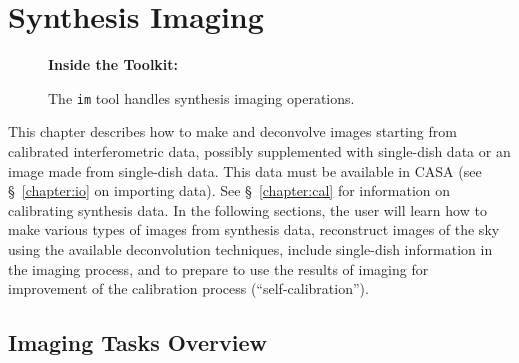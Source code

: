 

\chapter{Synthesis Imaging}
\label{chapter:im}

\begin{wrapfigure}{r}{2.5in}
  \begin{boxedminipage}{2.5in}
     \centerline{\bf Inside the Toolkit:}
     The {\tt im} tool handles synthesis imaging operations.
  \end{boxedminipage}
\end{wrapfigure}

This chapter describes how to make and deconvolve images starting from
calibrated interferometric data, possibly supplemented with
single-dish data or an image made from single-dish data.  This data
must be available in CASA (see \S~\ref{chapter:io} on importing data).
See \S~\ref{chapter:cal} for information on calibrating synthesis 
data.  In the following sections, the user will learn how to 
make various types of images from synthesis data, reconstruct images
of the sky using the available deconvolution techniques, include
single-dish information in the imaging process, and to prepare
to use the results of imaging for improvement of the calibration 
process (``self-calibration'').

\section{Imaging Tasks Overview}
\label{section:im.tasks}

